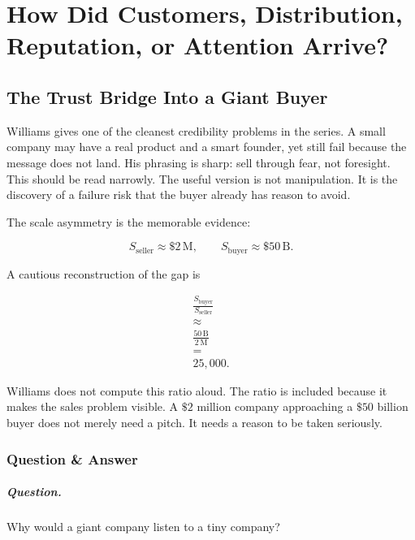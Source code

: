 \documentclass[11pt,oneside]{book}
\begin{document}
\chapter{How Did Customers, Distribution, Reputation, or Attention Arrive?}

\section{The Trust Bridge Into a Giant Buyer}

Williams gives one of the cleanest credibility problems in the series. A small company may have a real product and a smart founder, yet still fail because the message does not land. His phrasing is sharp: sell through fear, not foresight. This should be read narrowly. The useful version is not manipulation. It is the discovery of a failure risk that the buyer already has reason to avoid.

The scale asymmetry is the memorable evidence:

\begin{equation}
S_{\mathrm{seller}}\approx \$2\,\mathrm{M},
\qquad
S_{\mathrm{buyer}}\approx \$50\,\mathrm{B}.
\end{equation}

A cautious reconstruction of the gap is

\begin{equation}
\begin{gathered}
\frac{S_{\mathrm{buyer}}}{S_{\mathrm{seller}}}\\
\approx\\
\frac{50\,\mathrm{B}}{2\,\mathrm{M}}\\
=\\
25{,}000.
\end{gathered}
\end{equation}

Williams does not compute this ratio aloud. The ratio is included because it makes the sales problem visible. A \(\$2\) million company approaching a \(\$50\) billion buyer does not merely need a pitch. It needs a reason to be taken seriously.

\subsection{Question \& Answer}

\paragraph{Question.}
Why would a giant company listen to a tiny company?
\end{document}

